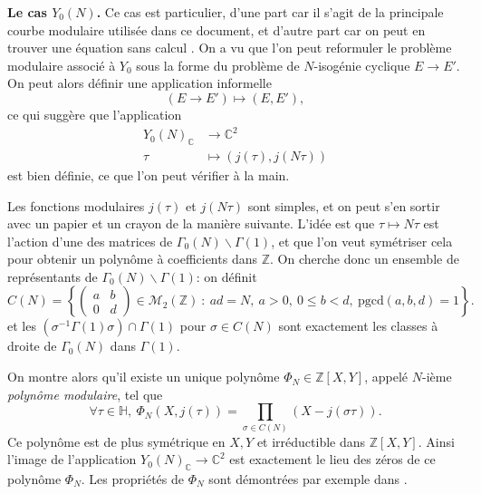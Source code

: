 \documentclass[11pt,a4paper]{article}
\newcommand{\Z}{\mathbb{Z}}
\newcommand{\C}{\mathbb{C}}
\renewcommand{\H}{\mathbb{H}}
\newcommand{\M}{\mathcal{M}}
\renewcommand{\b}{\backslash}
\newcommand{\vers}{\longrightarrow}
\theoremstyle{definition}
\begin{document}
\textbf{Le cas $Y_0(N)$.} Ce cas est particulier, d'une part car il s'agit de la principale courbe modulaire utilisée dans ce document, et d'autre part car on peut en trouver une équation \og sans calcul \fg. On a vu que l'on peut reformuler le problème modulaire associé à $Y_0$ sous la forme du problème de $N$-isogénie cyclique $E\to E'$. On peut alors définir une application informelle
$$(E\to E') \longmapsto (E, E'),$$
ce qui suggère que l'application
$$\begin{aligned}
Y_0(N)_\C &\vers \C^2 \\
 \tau &\longmapsto (j(\tau), j(N\tau))
\end{aligned}$$
est bien définie, ce que l'on peut vérifier à la main.

Les fonctions modulaires $j(\tau)$ et $j(N\tau)$ sont simples, et on peut s'en sortir avec un papier et un crayon de la manière suivante. L'idée est que $\tau\mapsto N\tau$ est l'action d'une des matrices de $\Gamma_0(N)\b \Gamma(1)$, et que l'on veut symétriser cela pour obtenir un polynôme à coefficients dans $\Z$. On cherche donc un ensemble de représentants de $\Gamma_0(N)\b \Gamma(1)$: on définit
$$C(N)=\left\{ 
\left(
\begin{matrix}
a & b \\
0 & d 
\end{matrix}
\right)
\in \M_2(\Z)\ :\ ad=N,\ a>0,\ 0\leq b<d,\ \mathrm{pgcd}(a,b,d)=1\right\}.$$
et les $(\sigma^{-1}\Gamma(1)\sigma)\cap \Gamma(1)$ pour $\sigma\in C(N)$ sont exactement les classes à droite de $\Gamma_0(N)$ dans $\Gamma(1)$.

On montre alors qu'il existe un unique  polynôme $\Phi_N \in \Z[X,Y]$, appelé $N$-ième \emph{polynôme modulaire}, tel que
$$\forall \tau\in\H,\ \Phi_N(X,j(\tau))=\prod_{\sigma\in C(N)} (X-j(\sigma\tau)).$$
Ce polynôme est de plus symétrique en $X, Y$ et irréductible dans $\Z[X, Y]$. Ainsi l'image de l'application $Y_0(N)_\C\vers \C^2$ est exactement le lieu des zéros de ce polynôme $\Phi_N$. Les propriétés de $\Phi_N$ sont démontrées par exemple dans \cite{Sil2}.
\end{document}
